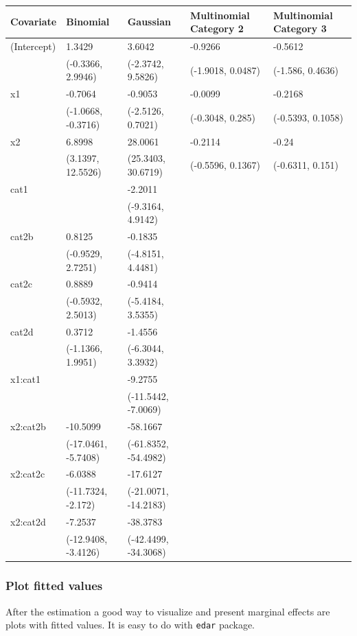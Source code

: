 \documentclass[a4paper]{article}
\begin{document}
\begin{center}
\begin{tabular}{lllll}
Covariate & Binomial & Gaussian & Multinomial Category 2 & Multinomial Category 3\\
\hline
(Intercept) & 1.3429 & 3.6042 & -0.9266 & -0.5612\\
 & (-0.3366, 2.9946) & (-2.3742, 9.5826) & (-1.9018, 0.0487) & (-1.586, 0.4636)\\
x1 & -0.7064 & -0.9053 & -0.0099 & -0.2168\\
 & (-1.0668, -0.3716) & (-2.5126, 0.7021) & (-0.3048, 0.285) & (-0.5393, 0.1058)\\
x2 & 6.8998 & 28.0061 & -0.2114 & -0.24\\
 & (3.1397, 12.5526) & (25.3403, 30.6719) & (-0.5596, 0.1367) & (-0.6311, 0.151)\\
cat1 &  & -2.2011 &  & \\
 &  & (-9.3164, 4.9142) &  & \\
cat2b & 0.8125 & -0.1835 &  & \\
 & (-0.9529, 2.7251) & (-4.8151, 4.4481) &  & \\
cat2c & 0.8889 & -0.9414 &  & \\
 & (-0.5932, 2.5013) & (-5.4184, 3.5355) &  & \\
cat2d & 0.3712 & -1.4556 &  & \\
 & (-1.1366, 1.9951) & (-6.3044, 3.3932) &  & \\
x1:cat1 &  & -9.2755 &  & \\
 &  & (-11.5442, -7.0069) &  & \\
x2:cat2b & -10.5099 & -58.1667 &  & \\
 & (-17.0461, -5.7408) & (-61.8352, -54.4982) &  & \\
x2:cat2c & -6.0388 & -17.6127 &  & \\
 & (-11.7324, -2.172) & (-21.0071, -14.2183) &  & \\
x2:cat2d & -7.2537 & -38.3783 &  & \\
 & (-12.9408, -3.4126) & (-42.4499, -34.3068) &  & \\
\end{tabular}
\end{center}
\subsubsection{Plot fitted values}
\label{sec:org0f21682}

After the estimation a good way to visualize and present marginal effects are plots with fitted values. It is easy to do with \texttt{edar} package.
\end{document}
